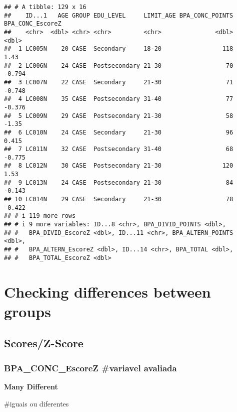 \documentclass[
]{article}
\newenvironment{Shaded}{\begin{snugshade}}{\end{snugshade}}
\newcommand{\AttributeTok}[1]{\textcolor[rgb]{0.13,0.29,0.53}{#1}}
\newcommand{\DecValTok}[1]{\textcolor[rgb]{0.00,0.00,0.81}{#1}}
\newcommand{\DocumentationTok}[1]{\textcolor[rgb]{0.56,0.35,0.01}{\textbf{\textit{#1}}}}
\newcommand{\FunctionTok}[1]{\textcolor[rgb]{0.13,0.29,0.53}{\textbf{#1}}}
\newcommand{\NormalTok}[1]{#1}
\newcommand{\SpecialCharTok}[1]{\textcolor[rgb]{0.81,0.36,0.00}{\textbf{#1}}}
\newcommand{\StringTok}[1]{\textcolor[rgb]{0.31,0.60,0.02}{#1}}
\begin{document}
\begin{verbatim}
## # A tibble: 129 x 16
##    ID...1   AGE GROUP EDU_LEVEL     LIMIT_AGE BPA_CONC_POINTS BPA_CONC_EscoreZ
##    <chr>  <dbl> <chr> <chr>         <chr>               <dbl>            <dbl>
##  1 LC005N    20 CASE  Secondary     18-20                 118            1.43 
##  2 LC006N    24 CASE  Postsecondary 21-30                  70           -0.794
##  3 LC007N    22 CASE  Secondary     21-30                  71           -0.748
##  4 LC008N    35 CASE  Postsecondary 31-40                  77           -0.376
##  5 LC009N    29 CASE  Postsecondary 21-30                  58           -1.35 
##  6 LC010N    24 CASE  Secondary     21-30                  96            0.415
##  7 LC011N    32 CASE  Postsecondary 31-40                  68           -0.775
##  8 LC012N    30 CASE  Postsecondary 21-30                 120            1.53 
##  9 LC013N    24 CASE  Postsecondary 21-30                  84           -0.143
## 10 LC014N    29 CASE  Secondary     21-30                  78           -0.422
## # i 119 more rows
## # i 9 more variables: ID...8 <chr>, BPA_DIVID_POINTS <dbl>,
## #   BPA_DIVID_EscoreZ <dbl>, ID...11 <chr>, BPA_ALTERN_POINTS <dbl>,
## #   BPA_ALTERN_EscoreZ <dbl>, ID...14 <chr>, BPA_TOTAL <dbl>,
## #   BPA_TOTAL_EscoreZ <dbl>
\end{verbatim}

\section{\texorpdfstring{\textbf{Checking differences between
groups}}{Checking differences between groups}}\label{checking-differences-between-groups}

\subsection{\texorpdfstring{\textbf{Scores/Z-Score}}{Scores/Z-Score}}\label{scoresz-score}

\subsubsection{BPA\_CONC\_EscoreZ \#variavel
avaliada}\label{bpa_conc_escorez-variavel-avaliada}

\textbf{Many Different}

\#iguais ou diferentes

\begin{Shaded}
\end{Shaded}
\end{document}
